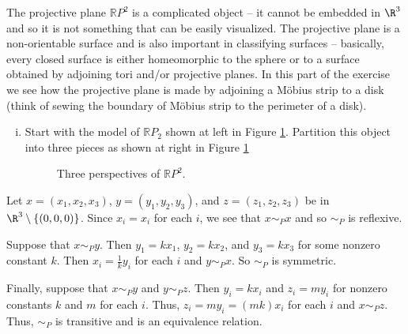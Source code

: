 \item The projective plane $\mathbb{R}P^2$ is a complicated object -- it cannot be embedded in $\R^3$ and so it is not something that can be easily visualized. The projective plane is a non-orientable surface and is also important in classifying surfaces -- basically, every closed surface is either homeomorphic to the sphere or to a surface obtained by adjoining tori and/or projective planes. In this part of the exercise we see how the projective plane is made by adjoining a M{\"o}bius strip to a disk (think of sewing the boundary of M{\"o}bius strip to the perimeter of a disk). 
	\begin{enumerate}[i.]
	
	\item Start with the model of $\mathbb{R}P_2$ shown at left in Figure \ref{F:projective_2}. Partition this object into three pieces as shown at right in Figure \ref{F:projective_2}

\begin{center}
\begin{figure}[h]
\begin{center}
 \hspace{0.25in} 
\caption{Three perspectives of $\mathbb{R}P^2$.} 
\label{F:projective_2}
\end{center}
\end{figure}
\end{center}

	\end{enumerate}

\ea


\ExerciseSolution

\ba

\item Let $x = (x_1,x_2,x_3)$, $y = (y_1,y_2,y_3)$, and $z = (z_1,z_2, z_3)$ be in $\R^3 \setminus \{(0,0,0)\}$. Since $x_i = x_i$ for each $i$, we see that $x \sim_P x$ and so $\sim_P$ is reflexive.

Suppose that $x \sim_P y$. Then $y_1 = kx_1$, $y_2 = kx_2$, and $y_3 = kx_3$ for some nonzero constant $k$. Then $x_i = \frac{1}{k} y_i$ for each $i$ and $y \sim_P x$. So $\sim_P$ is symmetric. 

Finally, suppose that $x \sim_P y$ and $y \sim_P z$. Then $y_i = kx_i$ and $z_i = my_i$ for nonzero constants $k$ and $m$ for each $i$. Thus, $z_i = my_i = (mk) x_i$ for each $i$ and $x \sim_P z$. Thus, $\sim_P$ is transitive and is an equivalence relation.

